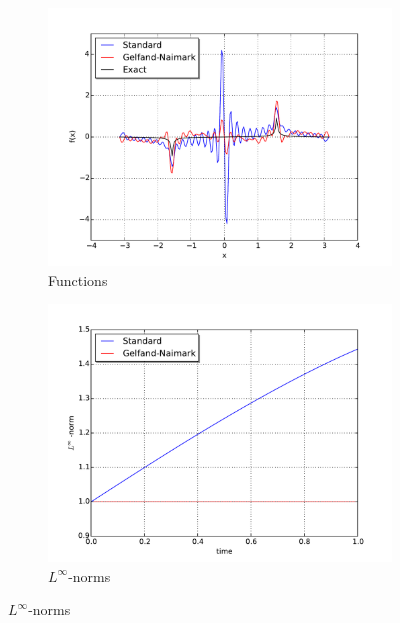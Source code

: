 \documentclass[12pt]{amsart}
\begin{document}
\begin{figure}
	\centering
	\begin{subfigure}{0.45\textwidth}
		\includegraphics[width=\textwidth]{./images/function_comparison.pdf}
		\caption{Functions}
		\label{fig:function}
	\end{subfigure}
	\begin{subfigure}{0.45\textwidth}
		\includegraphics[width=\textwidth]{./images/L_inf_plot.pdf}
		\caption{$L^{\infty}$-norms}
		\label{fig:sup norm}
	\end{subfigure}
\end{figure}
\end{document}
